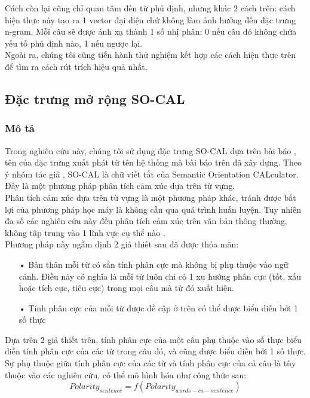 
Cách còn lại cũng chỉ quan tâm đến từ phủ định, nhưng khác 2 cách trên: cách hiện thực này tạo ra 1 vector đại diện chứ không làm ảnh hưởng đến đặc trưng n-gram. Mỗi câu sẽ được ánh xạ thành 1 số nhị phân: 0 nếu câu đó không chứa yếu tố phủ định nào, 1 nếu ngược lại.\\

Ngoài ra, chúng tôi cũng tiến hành thử nghiệm kết hợp các cách hiện thực trên để tìm ra cách rút trích hiệu quả nhất.
\subsection{Đặc trưng mở rộng SO-CAL} \label{sec:socal}
\subsubsection*{Mô tả}
Trong nghiên cứu này, chúng tôi sử dụng đặc trưng SO-CAL dựa trên bài báo \cite{taboada2011lexicon}, tên của đặc trưng xuất phát từ tên hệ thống mà bài báo trên đã xây dựng. Theo ý nhóm tác giả \cite{taboada2011lexicon}, SO-CAL là chữ viết tắt của Semantic Orientation CALculator. Đây là một phương pháp phân tích cảm xúc dựa trên từ vựng.\\

Phân tích cảm xúc dựa trên từ vựng là một phương pháp khác, tránh được bất lợi của phương pháp học máy là không cần qua quá trình huấn luyện. Tuy nhiên đa số các nghiên cứu này đều phân tích cảm xúc trên văn bản thông thường, không tập trung vào 1 lĩnh vực cụ thể nào \cite{taboada2011lexicon,Zhang2011,ohana2009sentiment,Giachanou2016}. \\

Phương pháp này ngầm định 2 giả thiết sau đã được thỏa mãn:
\begin{itemize}
\item[•] Bản thân mỗi từ có sẳn tính phân cực mà không bị phụ thuộc vào ngữ cảnh. Điều này có nghĩa là mỗi từ luôn chỉ có 1 xu hướng phân cực (tốt, xấu hoặc tích cực, tiêu cực) trong mọi câu mà từ đó xuất hiện.
\item[•] Tính phân cực của mỗi từ được đề cập ở trên có thể được biểu diễn bởi 1 số thực
\end{itemize}
Dựa trên 2 giả thiết trên, tính phân cực của một câu phụ thuộc vào số thực biểu diễn tính phân cực của các từ trong câu đó, và cũng được biểu diễn bởi 1 số thực. Sự phụ thuộc giữa tính phân cực của các từ và tính phân cực của cả câu là tùy thuộc vào các nghiên cứu, có thể mô hình hóa như công thức sau:
\begin{equation}
Polarity_{sentence}=f(Polarity_{words-in-sentence})
\end{equation}
